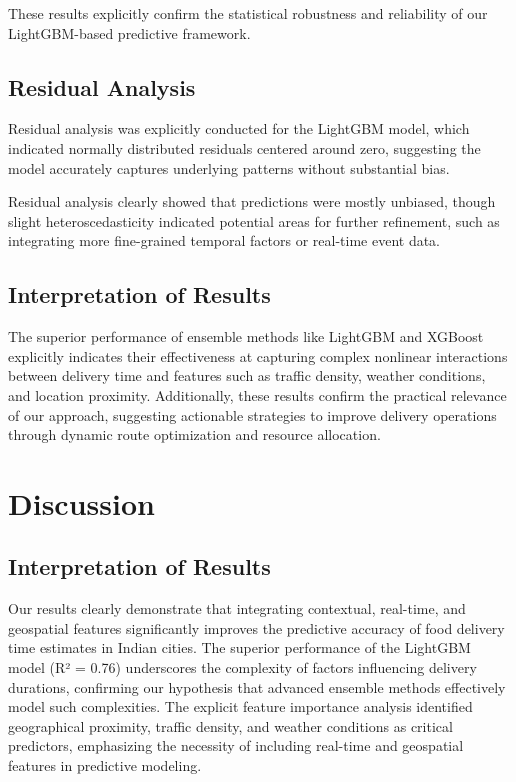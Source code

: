 \documentclass[10pt,twocolumn,letterpaper]{article}
\begin{document}
These results explicitly confirm the statistical robustness and reliability of our LightGBM-based predictive framework.

\subsection{Residual Analysis}
Residual analysis was explicitly conducted for the LightGBM model, which indicated normally distributed residuals centered around zero, suggesting the model accurately captures underlying patterns without substantial bias.

Residual analysis clearly showed that predictions were mostly unbiased, though slight heteroscedasticity indicated potential areas for further refinement, such as integrating more fine-grained temporal factors or real-time event data.

\subsection{Interpretation of Results}
The superior performance of ensemble methods like LightGBM and XGBoost explicitly indicates their effectiveness at capturing complex nonlinear interactions between delivery time and features such as traffic density, weather conditions, and location proximity. Additionally, these results confirm the practical relevance of our approach, suggesting actionable strategies to improve delivery operations through dynamic route optimization and resource allocation.

\section{Discussion}

\subsection{Interpretation of Results}
Our results clearly demonstrate that integrating contextual, real-time, and geospatial features significantly improves the predictive accuracy of food delivery time estimates in Indian cities. The superior performance of the LightGBM model (R² = 0.76) underscores the complexity of factors influencing delivery durations, confirming our hypothesis that advanced ensemble methods effectively model such complexities. The explicit feature importance analysis identified geographical proximity, traffic density, and weather conditions as critical predictors, emphasizing the necessity of including real-time and geospatial features in predictive modeling.
\end{document}
